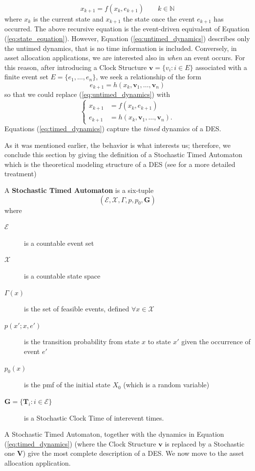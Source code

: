 \begin{equation}\label{eq:untimed_dynamics}
x_{k+1} = f(x_k,e_{k+1}) \qquad k \in \mathbb{N}
\end{equation}
where $x_k$ is the current state and $x_{k+1}$ the state once the event $e_{k+1}$ has occurred. The above recursive equation is the event-driven equivalent of Equation (\ref{eq:state_equation}). However, Equation (\ref{eq:untimed_dynamics}) describes only the untimed dynamics, that is no time information is included. Conversely, in asset allocation applications, we are interested also in \textit{when} an event occurs. For this reason, after introducing a Clock Structure $\bm{v} = \{v_i \colon i \in E\}$ associated with a finite event set $E = \{e_1,\ldots,e_n\}$, we seek a relationship of the form \[ e_{k+1} = h(x_k,\bm{v}_1,\ldots,\bm{v}_n)\] so that we could replace (\ref{eq:untimed_dynamics}) with
\begin{equation}\label{eq:timed_dynamics}
\begin{cases}
x_{k+1} & = f(x_k,e_{k+1})\\
e_{k+1} & = h(x_k,\bm{v}_1,\ldots,\bm{v}_n).
\end{cases}
\end{equation}
Equations (\ref{eq:timed_dynamics}) capture the \textit{timed} dynamics of a \gls{DES}.

As it was mentioned earlier, the  behavior is what interests us; therefore, we conclude this section by giving the definition of a Stochastic Timed Automaton which is the theoretical modeling structure of a \gls{DES} (see \cite{cassandras2009} for a more detailed treatment)
\begin{definition}
	A \textbf{Stochastic Timed Automaton} is a six-tuple \[ (\mathcal{E},\mathcal{X},\Gamma,p,p_0,\bm{G})\]
	where 
	\begin{description}
		\item[$\mathcal{E}$] is a countable event set
		\item[$\mathcal{X}$] is a countable state space
		\item[$\Gamma(x)$] is the set of feasible events, defined $\forall x \in \mathcal{X}$
		\item[$p(x';x,e')$] is the transition probability from state $x$ to state $x'$ given the occurrence of event $e'$
		\item[$p_0(x)$] is the pmf of the initial state $X_0$ (which is a random variable)
		\item[$\bm{G}=\{\bm{T}_i \colon i \in \mathcal{E}\}$] is a Stochastic Clock Time of interevent times.
	\end{description}
\end{definition}
A Stochastic Timed Automaton, together with the dynamics in Equation (\ref{eq:timed_dynamics}) (where the Clock Structure $\bm{v}$ is replaced by a Stochastic one $\bm{V}$) give the most complete description of a \gls{DES}. We now move to the asset allocation application.
